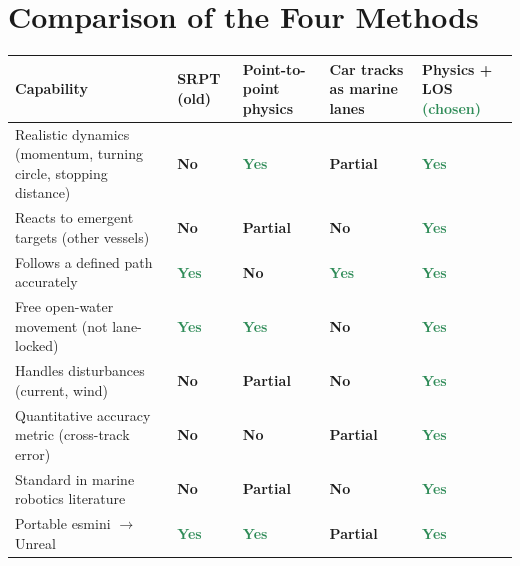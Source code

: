 \documentclass[11pt]{article}
\newcommand{\good}{\textcolor{seagreen}{\textbf{Yes}}}
\newcommand{\bad}{\textcolor{red!70!black}{\textbf{No}}}
\newcommand{\partly}{\textcolor{orange!80!black}{\textbf{Partial}}}
\begin{document}
\section{Comparison of the Four Methods}
\renewcommand{\arraystretch}{1.35}
\begin{center}
\footnotesize
\begin{tabular}{p{3.5cm} >{\centering\arraybackslash}p{2.4cm} >{\centering\arraybackslash}p{2.4cm} >{\centering\arraybackslash}p{2.4cm} >{\centering\arraybackslash}p{2.4cm}}
\toprule
\textbf{Capability} & \textbf{SRPT (old)} & \textbf{Point-to-point physics} & \textbf{Car tracks as marine lanes} & \textbf{Physics + LOS \textcolor{seagreen}{(chosen)}} \\
\midrule
Realistic dynamics (momentum, turning circle, stopping distance) & \bad & \good & \partly & \good \\
Reacts to emergent targets (other vessels) & \bad & \partly & \bad & \good \\
Follows a defined path accurately & \good & \bad & \good & \good \\
Free open-water movement (not lane-locked) & \good & \good & \bad & \good \\
Handles disturbances (current, wind) & \bad & \partly & \bad & \good \\
Quantitative accuracy metric (cross-track error) & \bad & \bad & \partly & \good \\
Standard in marine robotics literature & \bad & \partly & \bad & \good \\
Portable esmini $\rightarrow$ Unreal & \good & \good & \partly & \good \\
\bottomrule
\end{tabular}
\end{center}
\end{document}
